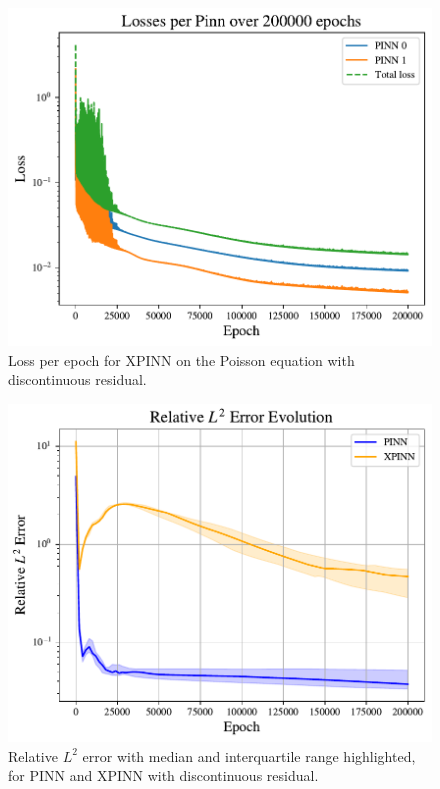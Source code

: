 \begin{figure}[h]
    \centering
    \includegraphics[width=\linewidth]{Project1XPINNs/figures/Poisson/new_exp/discrete_xpinn_Poisson_losses.pdf}
    \caption{Loss per epoch for XPINN on the Poisson equation with discontinuous residual.}
    \label{fig:xpinn_disc_loss}
\end{figure}
\begin{figure}[h!]
    \centering
    \includegraphics[width = \linewidth]{Project1XPINNs/figures/Poisson/discrete_l2_error_evolution.pdf}
    \caption{Relative $L^2$ error with median and interquartile range highlighted, for PINN and XPINN with discontinuous residual.}
    \label{fig:rel_l2_discrete_poisson}
\end{figure}

